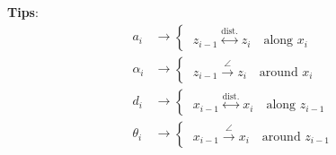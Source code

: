 \vspace*{10pt}
\textbf{Tips}:
\begin{align*}
a_i &\rightarrow
\begin{cases}
\ z_{i-1} \overset{\text{dist.}}{\longleftrightarrow} z_i \quad \text{along } x_i
\end{cases}\\
%
\alpha_i &\rightarrow
\begin{cases}
\ z_{i-1} \overset{\angle}{\longrightarrow} z_i \quad \text{around } x_i
\end{cases}\\
%
d_i &\rightarrow
\begin{cases}
\ x_{i-1} \overset{\text{dist.}}{\longleftrightarrow} x_i \quad \text{along } z_{i-1}
\end{cases}\\
%
\theta_i &\rightarrow
\begin{cases}
\ x_{i-1} \overset{\angle}{\longrightarrow} x_i \quad \text{around } z_{i-1}
\end{cases}
\end{align*}
\vspace*{-15pt}
